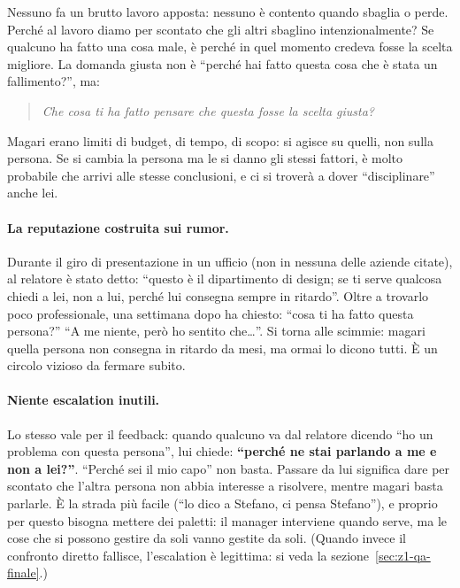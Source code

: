 Nessuno fa un brutto lavoro apposta: nessuno è contento quando sbaglia o
perde. Perché al lavoro diamo per scontato che gli altri sbaglino
intenzionalmente? Se qualcuno ha fatto una cosa male, è perché in quel momento
credeva fosse la scelta migliore. La domanda giusta non è ``perché hai fatto
questa cosa che è stata un fallimento?'', ma:

\begin{quote}
  \emph{Che cosa ti ha fatto pensare che questa fosse la scelta giusta?}
\end{quote}

Magari erano limiti di budget, di tempo, di scopo: si agisce su quelli, non
sulla persona. Se si cambia la persona ma le si danno gli stessi fattori, è
molto probabile che arrivi alle stesse conclusioni, e ci si troverà a dover
``disciplinare'' anche lei.

\paragraph{La reputazione costruita sui rumor.} Durante il giro di
presentazione in un ufficio (non in nessuna delle aziende citate), al relatore
è stato detto: ``questo è il dipartimento di design; se ti serve qualcosa
chiedi a lei, non a lui, perché lui consegna sempre in ritardo''. Oltre a
trovarlo poco professionale, una settimana dopo ha chiesto: ``cosa ti ha fatto
questa persona?'' ``A me niente, però ho sentito che\dots''. Si torna alle
scimmie: magari quella persona non consegna in ritardo da mesi, ma ormai lo
dicono tutti. È un circolo vizioso da fermare subito.

\paragraph{Niente escalation inutili.} Lo stesso vale per il feedback: quando
qualcuno va dal relatore dicendo ``ho un problema con questa persona'', lui
chiede: \textbf{``perché ne stai parlando a me e non a lei?''}. ``Perché sei il
mio capo'' non basta. Passare da lui significa dare per scontato che l'altra
persona non abbia interesse a risolvere, mentre magari basta parlarle. È la
strada più facile (``lo dico a Stefano, ci pensa Stefano''), e proprio per
questo bisogna mettere dei paletti: il manager interviene quando serve, ma le
cose che si possono gestire da soli vanno gestite da soli. (Quando invece il
confronto diretto fallisce, l'escalation è legittima: si veda la
sezione~\ref{sec:z1-qa-finale}.)

